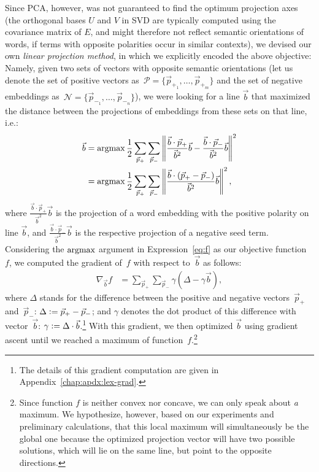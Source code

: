 Since PCA, however, was not guaranteed to find the optimum projection
axes (the orthogonal bases $U$ and $V$ in SVD are typically computed
using the covariance matrix of $E$, and might therefore not reflect
semantic orientations of words, if terms with opposite polarities
occur in similar contexts), we devised our own \emph{linear projection
  method}, in which we explicitly encoded the above objective: Namely,
given two sets of vectors with opposite semantic orientations (let us
denote the set of positive vectors as~$\mathcal{P} =
\{\vec{p}_{+_1},\ldots,\vec{p}_{+_m}\}$ and the set of negative
embeddings as~$\mathcal{N} = \{\vec{p}_{-_1},\ldots,\vec{p}_{-_n}\}$),
we were looking for a line $\vec{b}$ that maximized the distance
between the projections of embeddings from these sets on that line, i.e.: {\small%
  \begin{align}
    \begin{split}
      \small
      \vec{b} &=\argmax\frac{1}{2}\sum_{\vec{p}_+}\sum_{\vec{p}_-}%
      \left\lVert\frac{\vec{b}\cdot\vec{p}_+}{\vec{b}^2}\vec{b}%
      - \frac{\vec{b}\cdot\vec{p}_-}{\vec{b}^2}\vec{b}\right\rVert^2\\
      &=\argmax\frac{1}{2}\sum_{\vec{p}_+}\sum_{\vec{p}_-}\left\lVert\frac{\vec{b}%
        \cdot\left(\vec{p}_{+}-\vec{p}_{-}\right)}{\vec{b}^2}\vec{b}\right\rVert^2,\label{eq:f}%
    \end{split}
  \end{align}\normalsize}%
where $\frac{\vec{b}\cdot\vec{p}_+}{\vec{b}^2}\vec{b}$ is the
projection of a word embedding with the positive polarity on line
$\vec{b}$, and $\frac{\vec{b}\cdot\vec{p}_-}{\vec{b}^2}\vec{b}$ is the
respective projection of a negative seed term.  Considering the
$\argmax$ argument in Expression~\ref{eq:f} as our objective
function~$f$, we computed the gradient of~$f$ with respect
to~$\vec{b}$ as follows: {\small%
  \begin{align}
    \nabla_{\vec{b}} f &= \sum_{\vec{p}_+}\sum_{\vec{p}_-}%
               \gamma\left(\Delta - \gamma\vec{b}\right),\label{eq:prj-line-grad}%
\end{align}\normalsize}%
where $\Delta$ stands for the difference between the positive and
negative vectors~$\vec{p}_{+}$ and~$\vec{p}_{-}$: $\Delta \vcentcolon=
\vec{p}_{+}-\vec{p}_{-}$; and $\gamma$ denotes the dot product of this
difference with vector~$\vec{b}$: $\gamma \vcentcolon= \Delta \cdot
\vec{b}$.\footnote{The details of this gradient computation are given
  in Appendix~\ref{chap:apdx:lex-grad}.}  With this gradient, we then
optimized $\vec{b}$ using gradient ascent until we reached a maximum
of function~$f$.\footnote{Since function $f$ is neither convex nor
  concave, we can only speak about \emph{a} maximum.  We hypothesize,
  however, based on our experiments and preliminary calculations, that
  this local maximum will simultaneously be the global one because the
  optimized projection vector will have two possible solutions, which
  will lie on the same line, but point to the opposite directions.}


